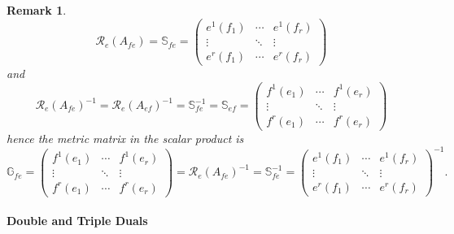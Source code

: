 \documentclass[aps,preprint]{revtex4}
\newtheorem{remark}[theorem]{Remark}
\begin{document}
\begin{remark}
\label{Scalar product metric matrix}%
\begin{equation}
\mathcal{R}_{e}\left( A_{fe}\right) =\mathbb{S}_{fe}=\left( 
\begin{array}{ccc}
e^{1}\left( f_{1}\right) & \cdots & e^{1}\left( f_{r}\right) \\ 
\vdots & \ddots & \vdots \\ 
e^{r}\left( f_{1}\right) & \cdots & e^{r}\left( f_{r}\right)%
\end{array}%
\right)
\end{equation}%
and 
\begin{equation}
\mathcal{R}_{e}\left( A_{fe}\right) ^{-1}=\mathcal{R}_{e}\left(
A_{ef}\right) ^{-1}=\mathbb{S}_{fe}^{-1}=\mathbb{S}_{ef}=\left( 
\begin{array}{ccc}
f^{1}\left( e_{1}\right) & \cdots & f^{1}\left( e_{r}\right) \\ 
\vdots & \ddots & \vdots \\ 
f^{r}\left( e_{1}\right) & \cdots & f^{r}\left( e_{r}\right)%
\end{array}%
\right)
\end{equation}%
hence the metric matrix in the scalar product is 
\begin{equation}
\mathbb{G}_{fe}=\left( 
\begin{array}{ccc}
f^{1}\left( e_{1}\right) & \cdots & f^{1}\left( e_{r}\right) \\ 
\vdots & \ddots & \vdots \\ 
f^{r}\left( e_{1}\right) & \cdots & f^{r}\left( e_{r}\right)%
\end{array}%
\right) =\mathcal{R}_{e}\left( A_{fe}\right) ^{-1}=\mathbb{S}%
_{fe}^{-1}=\left( 
\begin{array}{ccc}
e^{1}\left( f_{1}\right) & \cdots & e^{1}\left( f_{r}\right) \\ 
\vdots & \ddots & \vdots \\ 
e^{r}\left( f_{1}\right) & \cdots & e^{r}\left( f_{r}\right)%
\end{array}%
\right) ^{-1}.
\end{equation}
\end{remark}

\paragraph{Double and Triple Duals}
\end{document}
